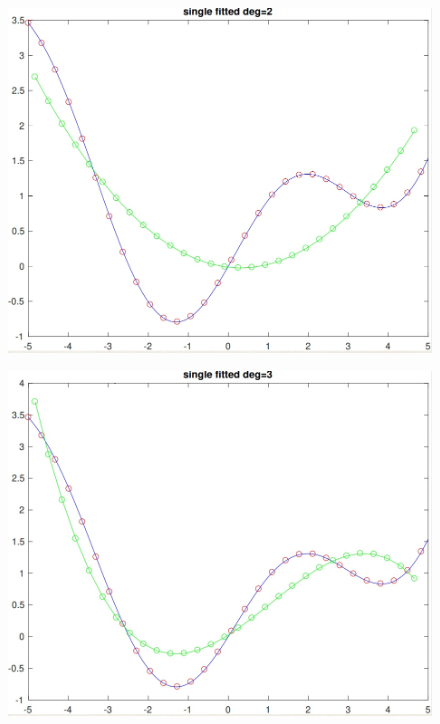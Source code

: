 \documentclass[11pt]{article}
\begin{document}
\begin{figure}[h!]
\centering\includegraphics[scale=0.3]{clean_poly_d_2.png}
\end{figure}

\begin{figure}[h!]
\centering\includegraphics[scale=0.3]{clean_poly_d_3.png}
\end{figure}
\end{document}

